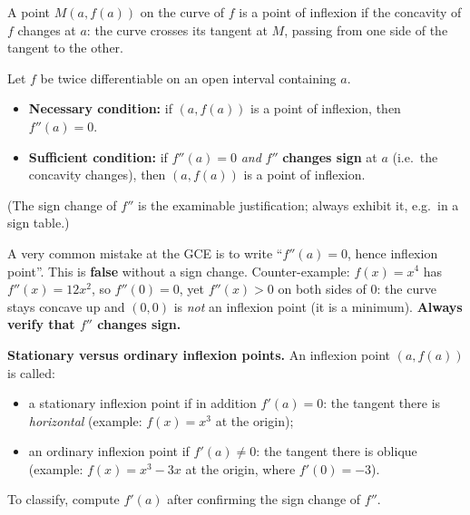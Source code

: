 \documentclass[11pt]{article}
\newcommand{\cle}[1]{{\popxbold\color{popdark}#1}}
\begin{document}
\begin{definition}
A point $M(a, f(a))$ on the curve of $f$ is a \cle{point of inflexion} if the concavity of $f$ changes at $a$: the curve crosses its tangent at $M$, passing from one side of the tangent to the other.
\end{definition}

\begin{propriete}
Let $f$ be twice differentiable on an open interval containing $a$.
\begin{itemize}
\item \textbf{Necessary condition:} if $(a, f(a))$ is a point of inflexion, then $f''(a) = 0$.
\item \textbf{Sufficient condition:} if $f''(a) = 0$ \emph{and} $f''$ \textbf{changes sign} at $a$ (i.e.\ the concavity changes), then $(a, f(a))$ is a point of inflexion.
\end{itemize}
(The sign change of $f''$ is the examinable justification; always exhibit it, e.g.\ in a sign table.)
\end{propriete}

\begin{attention}[$f''(a) = 0$ is not enough]
A very common mistake at the GCE is to write ``$f''(a)=0$, hence inflexion point''. This is \textbf{false} without a sign change. Counter-example: $f(x) = x^4$ has $f''(x) = 12x^2$, so $f''(0) = 0$, yet $f''(x) > 0$ on both sides of $0$: the curve stays concave up and $(0,0)$ is \emph{not} an inflexion point (it is a minimum). \textbf{Always verify that $f''$ changes sign.}
\end{attention}

\textbf{Stationary versus ordinary inflexion points.} An inflexion point $(a,f(a))$ is called:
\begin{itemize}
\item a \cle{stationary inflexion point} if in addition $f'(a) = 0$: the tangent there is \emph{horizontal} (example: $f(x)=x^3$ at the origin);
\item an \cle{ordinary inflexion point} if $f'(a) \neq 0$: the tangent there is oblique (example: $f(x) = x^3 - 3x$ at the origin, where $f'(0) = -3$).
\end{itemize}
To classify, compute $f'(a)$ after confirming the sign change of $f''$.
\end{document}
